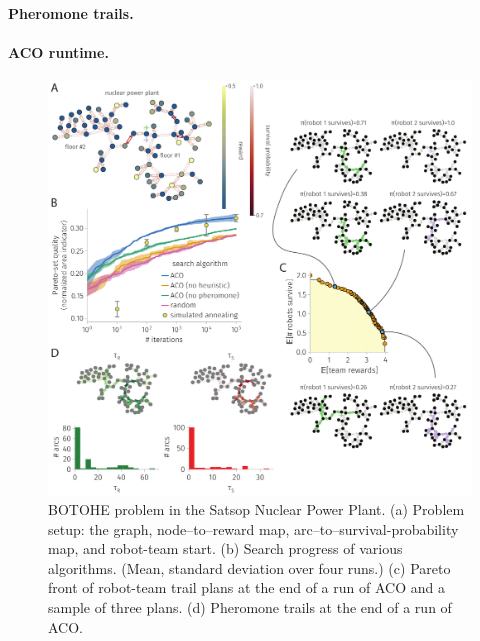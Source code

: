 \documentclass[fleqn,10pt,lineno]{wlpeerj}
\begin{document}
\paragraph{Pheromone trails.}

\paragraph{ACO runtime.}


\begin{figure}[h!]
    \centering
    	\includegraphics[width=\textwidth]{power_plant_results.pdf}
    \caption{
    BOTOHE problem in the Satsop Nuclear Power Plant. 
    (a) Problem setup: the graph, node--to--reward map, arc--to--survival-probability map, and robot-team start.
    (b) Search progress of various algorithms. (Mean, standard deviation over four runs.)
    (c) Pareto front of robot-team trail plans at the end of a run of ACO and a sample of three plans.
    (d) Pheromone trails at the end of a run of ACO.
    } \label{fig:power_plant}
\end{figure}

\end{document}
